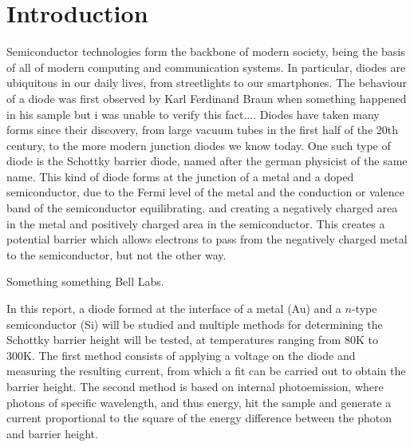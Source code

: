 \section{Introduction}
Semiconductor technologies form the backbone of modern society, being the basis of all of modern computing and communication systems.
In particular, diodes are ubiquitous in our daily lives, from streetlights to our smartphones.
The behaviour of a diode was first observed by Karl Ferdinand Braun when something happened in his sample but i was unable to verify this fact....
Diodes have taken many forms since their discovery, from large vacuum tubes in the first half of the 20th century, to the more modern junction diodes we know today. One such type of diode is the Schottky barrier diode, named after the german physicist of the same name.
This kind of diode forms at the junction of a metal and a doped semiconductor, due to the Fermi level of the metal and the conduction or valence band of the semiconductor equilibrating. and creating a negatively charged area in the metal and positively charged area in the semiconductor. This creates a potential barrier which allows electrons to pass from the negatively charged metal to the semiconductor, but not the other way.


Something something Bell Labs.


In this report, a diode formed at the interface of a metal (Au) and a $n$-type semiconductor (Si) will be studied and multiple methods for determining the Schottky barrier height will be tested, at temperatures ranging from 80K to 300K. The first method consists of applying a voltage on the diode and measuring the resulting current, from which a fit can be carried out to obtain the barrier height. The second method is based on internal photoemission, where photons of specific wavelength, and thus energy, hit the sample and generate a current proportional to the square of the energy difference between the photon and barrier height.
